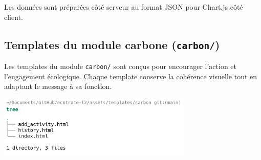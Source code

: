 \documentclass[a4paper,11pt]{article}
\begin{document}
\begin{enumerate}
                            \noindent Les données sont préparées côté serveur au format JSON pour Chart.js côté client.
                    \end{enumerate}

            \subsection{Templates du module carbone (\texttt{carbon/})}
                \noindent Les templates du module \texttt{carbon/} sont conçus pour encourager l'action et l'engagement écologique. Chaque template conserve la cohérence visuelle tout en adaptant le message à sa fonction.

                \begin{center}
                    \includegraphics[width=0.7\textwidth]{captures/templates_et_static/templates/carbon/img1.png}
                \end{center}
\end{document}
